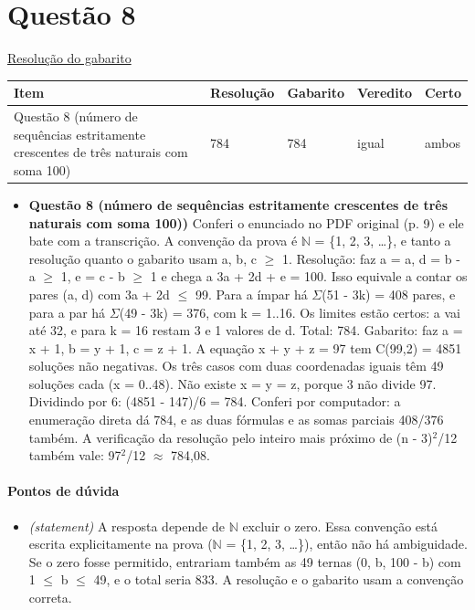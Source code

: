 \documentclass{article}%
\begin{document}
\section*{Questão 8}%
\href{https://poliedroresolve.sistemapoliedro.com.br/vestibulares/ita/2026/ita-2-fase-dia-1-28-10-2025-2-fase-dia-1/dissertativa-8-matematica-2-fase-dia-1-ita-2026}{Resolução do gabarito}\par\smallskip%
\begin{longtable}{@{}p{} p{} p{} p{} p{}@{}}\toprule Item & Resolução & Gabarito & Veredito & Certo \\ \midrule
Questão 8 (número de sequências estritamente crescentes de três naturais com soma 100) & 784 & 784 & igual & ambos \\
\bottomrule\end{longtable}%
\begin{itemize}%
\item%
\textbf{Questão 8 (número de sequências estritamente crescentes de três naturais com soma 100))} Conferi o enunciado no PDF original (p. 9) e ele bate com a transcrição. A convenção da prova é $\mathbb{N}$ = \{1, 2, 3, \ldots{}\}, e tanto a resolução quanto o gabarito usam a, b, c $\geq$ 1.\newline%
\newline%
Resolução: faz a = a, d = b - a $\geq$ 1, e = c - b $\geq$ 1 e chega a 3a + 2d + e = 100. Isso equivale a contar os pares (a, d) com 3a + 2d $\leq$ 99. Para a ímpar há $\Sigma$(51 - 3k) = 408 pares, e para a par há $\Sigma$(49 - 3k) = 376, com k = 1..16. Os limites estão certos: a vai até 32, e para k = 16 restam 3 e 1 valores de d. Total: 784.\newline%
\newline%
Gabarito: faz a = x + 1, b = y + 1, c = z + 1. A equação x + y + z = 97 tem C(99,2) = 4851 soluções não negativas. Os três casos com duas coordenadas iguais têm 49 soluções cada (x = 0..48). Não existe x = y = z, porque 3 não divide 97. Dividindo por 6: (4851 - 147)/6 = 784.\newline%
\newline%
Conferi por computador: a enumeração direta dá 784, e as duas fórmulas e as somas parciais 408/376 também. A verificação da resolução pelo inteiro mais próximo de (n - 3)$^2$/12 também vale: 97$^2$/12 $\approx$ 784,08.%
\end{itemize}%
\paragraph{Pontos de dúvida}%
\begin{itemize}%
\item%
\textit{(statement)} A resposta depende de $\mathbb{N}$ excluir o zero. Essa convenção está escrita explicitamente na prova ($\mathbb{N}$ = \{1, 2, 3, \ldots{}\}), então não há ambiguidade. Se o zero fosse permitido, entrariam também as 49 ternas (0, b, 100 - b) com 1 $\leq$ b $\leq$ 49, e o total seria 833. A resolução e o gabarito usam a convenção correta.%
\end{itemize}%
\end{document}
